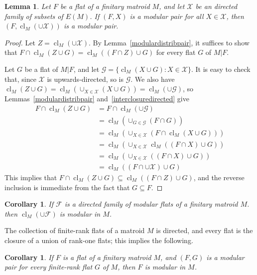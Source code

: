 \documentclass{amsart}
\theoremstyle{plain}
\newtheorem{lemma}[theorem]{Lemma}
\newtheorem{corollary}[theorem]{Corollary}
\theoremstyle{definition}
\newcommand{\cF}{\mathcal{F}}
\newcommand{\cG}{\mathcal{G}}
\newcommand{\cX}{\mathcal{X}}
\DeclareMathOperator{\cl}{cl}
\newcommand{\br}[1]{\left(#1\right)}
\renewcommand{\ss}{\subseteq}
\begin{document}
\begin{lemma}\label{modpairdirected}
  Let $F$ be a flat of a finitary matroid $M$, and let $\cX$ be an directed family 
  of subsets of $E(M)$. If $(F,X)$ is a modular pair for all $X \in \cX$,
  then $(F, \cl_M(\cup \cX))$ is a modular pair. 
\end{lemma}
\begin{proof}
  Let $Z = \cl_M(\cup \cX)$. By Lemma~\ref{modulardistribpair}, it suffices to show 
  that $F \cap \cl_M(Z \cup G) = \cl_M((F \cap Z) \cup G)$ for every flat $G$ of $M | F$. 

  Let $G$ be a flat of $M | F$, and let $\cG = \{\cl_M(X \cup G) : X \in \cX\}$. 
  It is easy to check that, since $\cX$ is upwards-directed, so is $\cG$. 
  We also have $\cl_M(Z \cup G) = \cl_M(\cup_{X \in \cX} (X \cup G)) = \cl_M(\cup \cG)$, 
  so Lemmas~\ref{modulardistribpair} and~\ref{interclosuredirected} give 
  \begin{align*}
      F \cap \cl_M(Z \cup G) &= F \cap \cl_M(\cup \cG) \\
      &= \cl_M\br{\cup_{G \in \cG}(F \cap G)} \\ 
      &= \cl_M\br{\cup_{X \in \cX} (F \cap \cl_M(X \cup G))} \\ 
      &= \cl_M\br{\cup_{X \in \cX}\cl_M((F \cap X) \cup G)}\\
      &= \cl_M\br{\cup_{X \in \cX}((F \cap X) \cup G)}\\
      &= \cl_M\br{(F \cap \cup \cX) \cup G}
  \end{align*}
  This implies that $F \cap \cl_M(Z \cup G) \ss \cl_M((F \cap Z) \cup G)$, 
  and the reverse inclusion is immediate from the fact that $G \ss F$. 
\end{proof}

\begin{corollary}
  If $\cF$ is a directed family of modular flats of a finitary matroid $M$. 
  then $\cl_M(\cup \cF)$ is modular in $M$. 
\end{corollary}

The collection of finite-rank flats of a matroid $M$ is directed, 
and every flat is the closure of a union of rank-one flats; 
this implies the following. 

\begin{corollary}\label{modularoffinite}
  If $F$ is a flat of a finitary matroid $M$, and $(F,G)$ is a modular pair for 
  every finite-rank flat $G$ of $M$, then $F$ is modular in $M$. 
\end{corollary}
\end{document}
